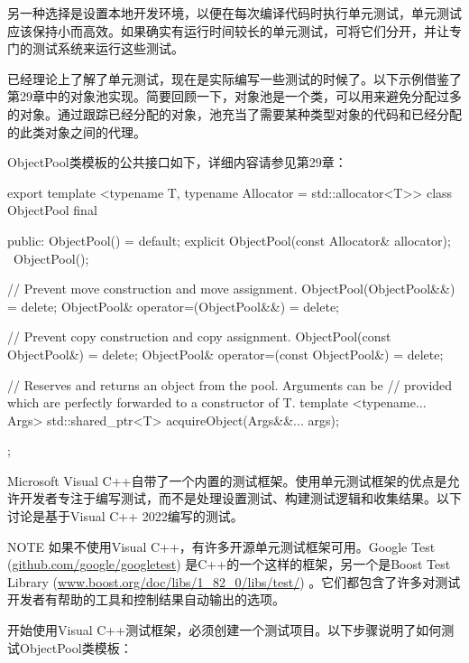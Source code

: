 另一种选择是设置本地开发环境，以便在每次编译代码时执行单元测试，单元测试应该保持小而高效。如果确实有运行时间较长的单元测试，可将它们分开，并让专门的测试系统来运行这些测试。


已经理论上了解了单元测试，现在是实际编写一些测试的时候了。以下示例借鉴了第29章中的对象池实现。简要回顾一下，对象池是一个类，可以用来避免分配过多的对象。通过跟踪已经分配的对象，池充当了需要某种类型对象的代码和已经分配的此类对象之间的代理。

ObjectPool类模板的公共接口如下，详细内容请参见第29章：

\begin{cpp}
export
template <typename T, typename Allocator = std::allocator<T>>
class ObjectPool final
{
    public:
        ObjectPool() = default;
        explicit ObjectPool(const Allocator& allocator);
        ~ObjectPool();

        // Prevent move construction and move assignment.
        ObjectPool(ObjectPool&&) = delete;
        ObjectPool& operator=(ObjectPool&&) = delete;

        // Prevent copy construction and copy assignment.
        ObjectPool(const ObjectPool&) = delete;
        ObjectPool& operator=(const ObjectPool&) = delete;

        // Reserves and returns an object from the pool. Arguments can be
        // provided which are perfectly forwarded to a constructor of T.
        template <typename... Args>
        std::shared_ptr<T> acquireObject(Args&&... args);
};
\end{cpp}


Microsoft Visual C++自带了一个内置的测试框架。使用单元测试框架的优点是允许开发者专注于编写测试，而不是处理设置测试、构建测试逻辑和收集结果。以下讨论是基于Visual C++ 2022编写的测试。

\begin{myNotic}{NOTE}
如果不使用Visual C++，有许多开源单元测试框架可用。Google Test (\url{github.com/google/googletest}) 是C++的一个这样的框架，另一个是Boost Test Library (\url{www.boost.org/doc/libs/1_82_0/libs/test/}) 。它们都包含了许多对测试开发者有帮助的工具和控制结果自动输出的选项。
\end{myNotic}

开始使用Visual C++测试框架，必须创建一个测试项目。以下步骤说明了如何测试ObjectPool类模板：

